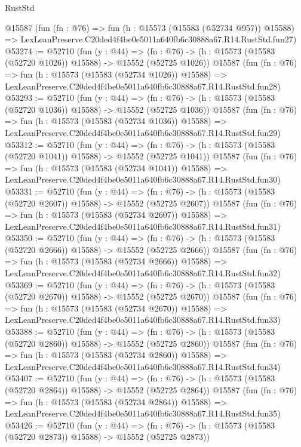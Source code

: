 \begin{lexlean}{RustStd}
\begin{coremodule}
    @15587
    (fun (fn : @76) =>
    fun (h : @15573 (@15583 (@52734 @957)) @15588) =>
    LexLeanPreserve.C20ded4f4be0e5011a640fb6c30888a67.R14.RustStd.fun27)
@53274 := @52710
    (fun (y : @44) =>
    (fn : @76) -> (h : @15573 (@15583 (@52720 @1026)) @15588) -> @15552 (@52725 @1026))
    @15587
    (fun (fn : @76) =>
    fun (h : @15573 (@15583 (@52734 @1026)) @15588) =>
    LexLeanPreserve.C20ded4f4be0e5011a640fb6c30888a67.R14.RustStd.fun28)
@53293 := @52710
    (fun (y : @44) =>
    (fn : @76) -> (h : @15573 (@15583 (@52720 @1036)) @15588) -> @15552 (@52725 @1036))
    @15587
    (fun (fn : @76) =>
    fun (h : @15573 (@15583 (@52734 @1036)) @15588) =>
    LexLeanPreserve.C20ded4f4be0e5011a640fb6c30888a67.R14.RustStd.fun29)
@53312 := @52710
    (fun (y : @44) =>
    (fn : @76) -> (h : @15573 (@15583 (@52720 @1041)) @15588) -> @15552 (@52725 @1041))
    @15587
    (fun (fn : @76) =>
    fun (h : @15573 (@15583 (@52734 @1041)) @15588) =>
    LexLeanPreserve.C20ded4f4be0e5011a640fb6c30888a67.R14.RustStd.fun30)
@53331 := @52710
    (fun (y : @44) =>
    (fn : @76) -> (h : @15573 (@15583 (@52720 @2607)) @15588) -> @15552 (@52725 @2607))
    @15587
    (fun (fn : @76) =>
    fun (h : @15573 (@15583 (@52734 @2607)) @15588) =>
    LexLeanPreserve.C20ded4f4be0e5011a640fb6c30888a67.R14.RustStd.fun31)
@53350 := @52710
    (fun (y : @44) =>
    (fn : @76) -> (h : @15573 (@15583 (@52720 @2666)) @15588) -> @15552 (@52725 @2666))
    @15587
    (fun (fn : @76) =>
    fun (h : @15573 (@15583 (@52734 @2666)) @15588) =>
    LexLeanPreserve.C20ded4f4be0e5011a640fb6c30888a67.R14.RustStd.fun32)
@53369 := @52710
    (fun (y : @44) =>
    (fn : @76) -> (h : @15573 (@15583 (@52720 @2670)) @15588) -> @15552 (@52725 @2670))
    @15587
    (fun (fn : @76) =>
    fun (h : @15573 (@15583 (@52734 @2670)) @15588) =>
    LexLeanPreserve.C20ded4f4be0e5011a640fb6c30888a67.R14.RustStd.fun33)
@53388 := @52710
    (fun (y : @44) =>
    (fn : @76) -> (h : @15573 (@15583 (@52720 @2860)) @15588) -> @15552 (@52725 @2860))
    @15587
    (fun (fn : @76) =>
    fun (h : @15573 (@15583 (@52734 @2860)) @15588) =>
    LexLeanPreserve.C20ded4f4be0e5011a640fb6c30888a67.R14.RustStd.fun34)
@53407 := @52710
    (fun (y : @44) =>
    (fn : @76) -> (h : @15573 (@15583 (@52720 @2864)) @15588) -> @15552 (@52725 @2864))
    @15587
    (fun (fn : @76) =>
    fun (h : @15573 (@15583 (@52734 @2864)) @15588) =>
    LexLeanPreserve.C20ded4f4be0e5011a640fb6c30888a67.R14.RustStd.fun35)
@53426 := @52710
    (fun (y : @44) =>
    (fn : @76) -> (h : @15573 (@15583 (@52720 @2873)) @15588) -> @15552 (@52725 @2873))

\end{coremodule}
\end{lexlean}
